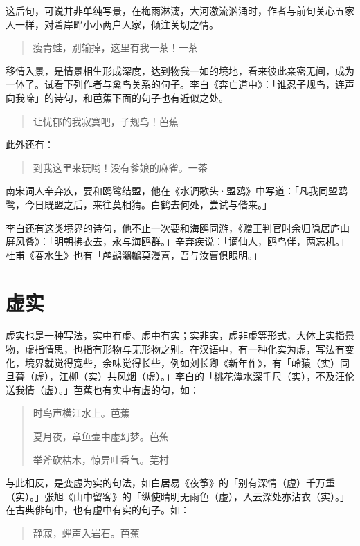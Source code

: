 {  这后句，可说并非单纯写景，在梅雨淋漓，大河激流汹涌时，作者与前句关心五家人一样，对着岸畔小小两户人家，倾注关切之情。

  \begin{quote}
      瘦青蛙，别输掉，这里有我一茶！\hfill 一茶
  \end{quote}

  移情入景，是情景相生形成深度，达到物我一如的境地，看来彼此亲密无间，成为一体了。试看下列作者与禽鸟关系的句子。李白《奔亡道中》：「谁忍子规鸟，连声向我啼」的诗句，和芭蕉下面的句子也有近似之处。

  \begin{quote}
      让忧郁的我寂寞吧，子规鸟！\hfill 芭蕉
  \end{quote}

  此外还有：
  \begin{quote}
      到我这里来玩哟！没有爹娘的麻雀。\hfill 一茶
  \end{quote}

  南宋词人辛弃疾，要和鸥鹭结盟，他在《水调歌头·盟鸥》中写道：「凡我同盟鸥鹭，今日既盟之后，来往莫相猜。白鹤去何处，尝试与偕来。」

  李白还有这类境界的诗句，他不止一次要和海鸥同游，《赠王判官时余归隐居庐山屏风叠》：「明朝拂衣去，永与海鸥群。」辛弃疾说：「谪仙人，鸥鸟伴，两忘机。」杜甫《春水生》也有「鸬鹚鸂鶒莫漫喜，吾与汝曹俱眼明。」

  \section*{\FS 虚实}

  虚实也是一种写法，实中有虚、虚中有实；实非实，虚非虚等形式，大体上实指景物，虚指情思，也指有形物与无形物之别。在汉语中，有一种化实为虚，写法有变化，境界就觉得宽些，余味觉得长些，例如刘长卿《新年作》，有「岭猿（实）同旦暮（虚），江柳（实）共风烟（虚）。」李白的「桃花潭水深千尺（实），不及汪伦送我情（虚）。」芭蕉也有实中有虚的句，如：

  \begin{quote}
      时鸟声横江水上。\hfill 芭蕉

      夏月夜，章鱼壶中虚幻梦。\hfill 芭蕉

      举斧砍枯木，惊异吐香气。\hfill 芜村
  \end{quote}

  与此相反，是变虚为实的句法，如白居易《夜筝》的「别有深情（虚）千万重（实）。」张旭《山中留客》的「纵使晴明无雨色（虚），入云深处亦沾衣（实）。」在古典俳句中，也有虚中有实的句子。如：

  \begin{quote}
      静寂，蝉声入岩石。\hfill 芭蕉
  \end{quote}

}
